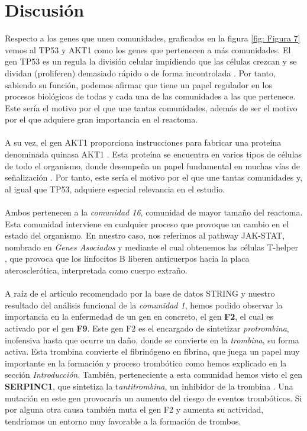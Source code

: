 \section{Discusión}
\hfill


\hfill

Respecto a los genes que unen comunidades, graficados en la figura \ref*{fig: Figura 7} vemos al TP53 y AKT1 como los genes que pertenecen a más comunidades. El gen TP53 es un regula la división celular impidiendo que las células crezcan y se dividan (proliferen) demasiado rápido o de forma incontrolada \cite{TP53}. Por tanto, sabiendo su función, podemos afirmar que tiene un papel regulador en los procesos biológicos de todas y cada una de las comunidades a las que pertenece. Este sería el motivo por el que une tantas comunidades, además de ser el motivo por el que adquiere gran importancia en el reactoma.\\\\  A su vez, el gen AKT1 proporciona instrucciones para fabricar una proteína denominada quinasa AKT1 \cite{AKT1}. Esta proteína se encuentra en varios tipos de células de todo el organismo, donde desempeña un papel fundamental en muchas vías de señalización \cite{AKT1}. Por tanto, este sería el motivo por el que une tantas comunidades y, al igual que TP53, adquiere especial relevancia en el estudio.\\\\
Ambos pertenecen a la \textit{comunidad 16}, comunidad de mayor tamaño del reactoma. Esta comunidad interviene en cualquier proceso que provoque un cambio en el estado del organismo. En nuestro caso, nos referimos al pathway JAK-STAT, nombrado en \textit{Genes Asociados} y mediante el cual obtenemos las células T-helper \cite{pathway}, que provoca que los linfocitos B liberen anticuerpos hacia la placa aterosclerótica, interpretada como cuerpo extraño.\\\\
A raíz de el artículo recomendado \cite{F2_F9} por la base de datos STRING \cite{STRING}  y nuestro resultado del análisis funcional de la \textit{comunidad 1}, hemos podido observar la importancia en la enfermedad de un gen en concreto, el gen \textbf{F2}, el cual es activado por el gen \textbf{F9}. Este gen F2 es el encargado de sintetizar \textit{protrombina}, inofensiva hasta que ocurre un daño, donde se convierte en la \textit{trombina}, su forma activa. Esta trombina convierte el fibrinógeno en fibrina, que juega un papel muy importante en la formación y proceso trombótico como hemos explicado en la sección \textit{Introducción}. También, perteneciente a esta comunidad hemos visto el gen \textbf{SERPINC1}, que sintetiza la t\textit{antitrombina}, un inhibidor de la trombina \cite{SERPINC1}. Una mutación en este gen provocaría un aumento del riesgo de eventos trombóticos. Si por alguna otra causa también muta el gen F2 y aumenta su actividad, tendríamos un entorno muy favorable a la formación de trombos.\\\\
